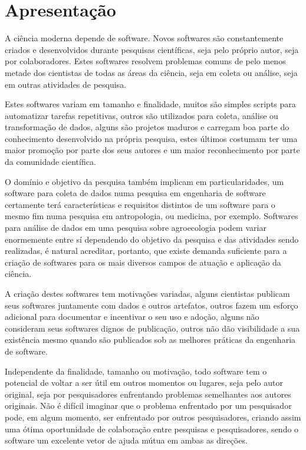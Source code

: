 
\section{Apresentação}

A ciência moderna depende de software. Novos softwares são constantemente
criados e desenvolvidos durante pesquisas científicas, seja pelo próprio autor,
seja por colaboradores. Estes softwares resolvem
problemas comuns de pelo menos metade dos cientistas de todas as áreas da
ciência, seja em coleta ou análise, seja em outras atividades de pesquisa.

Estes softwares variam em tamanho e finalidade, muitos são simples
scripts para automatizar tarefas repetitivas, outros são utilizados para
coleta, análise ou transformação de dados, alguns são projetos maduros e
carregam boa parte do conhecimento desenvolvido na própria pesquisa, estes
últimos costumam ter uma maior promoção por parte dos seus autores e um maior
reconhecimento por parte da comunidade científica.

O domínio e objetivo da pesquisa também implicam em particularidades,
um software para coleta de dados numa pesquisa em engenharia de
software certamente terá características e requisitos distintos de um software
para o mesmo fim numa pesquisa em antropologia, ou medicina, por exemplo.
Softwares para análise de dados em uma pesquisa sobre agroecologia podem variar
enormemente entre sí dependendo do objetivo da pesquisa e das atividades sendo
realizadas, é natural acreditar, portanto, que existe demanda suficiente para a
criação de softwares para os mais diversos campos de atuação e aplicação da
ciência.

A criação destes softwares tem motivações variadas, alguns cientistas publicam
seus softwares juntamente com dados e outros artefatos, outros fazem um esforço
adicional para documentar e incentivar o seu uso e adoção, alguns não
consideram seus softwares dignos de publicação, outros não dão visibilidade a
sua existência mesmo quando são publicados sob as melhores práticas da
engenharia de software.

Independente da finalidade, tamanho ou motivação, todo software tem o potencial
de voltar a ser útil em outros momentos ou lugares, seja pelo autor original,
seja por pesquisadores enfrentando problemas semelhantes aos autores originais.
Não é difícil imaginar que o problema enfrentado por um pesquisador pode, em
algum momento, ser enfrentado por outros pesquisadores, criando assim uma ótima
oportunidade de colaboração entre pesquisas e pesquisadores, sendo o software
um excelente vetor de ajuda mútua em ambas as direções.

